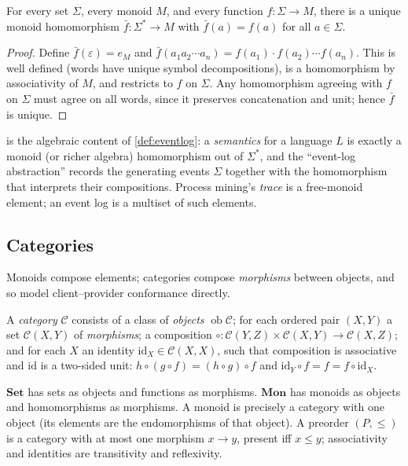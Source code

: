 \begin{theorem}
\label{thm:freemon}
For every set $\Sigma$, every monoid $M$, and every function $f\colon\Sigma\to M$,
there is a unique monoid homomorphism $\bar f\colon\Sigma^{*}\to M$ with $\bar
f(a)=f(a)$ for all $a\in\Sigma$.
\end{theorem}
\begin{proof}
Define $\bar f(\varepsilon)=e_M$ and $\bar f(a_1a_2\cdots a_n)=f(a_1)\cdot
f(a_2)\cdots f(a_n)$. This is well defined (words have unique symbol
decompositions), is a homomorphism by associativity of $M$, and restricts to $f$
on $\Sigma$. Any homomorphism agreeing with $f$ on $\Sigma$ must agree on all
words, since it preserves concatenation and unit; hence $\bar f$ is unique.
\end{proof}

 is the algebraic content of \cref{def:eventlog}: a
\emph{semantics} for a language $L$ is exactly a monoid (or richer algebra)
homomorphism out of $\Sigma^{*}$, and the ``event-log abstraction'' records the
generating events $\Sigma$ together with the homomorphism that interprets their
compositions. Process mining's \emph{trace} is a free-monoid element; an event
log is a multiset of such elements.

\subsection{Categories}
\label{sec:alg-cat}

Monoids compose elements; categories compose \emph{morphisms} between objects,
and so model client--provider conformance directly.

\begin{definition}[Category]
\label{def:category}
A \emph{category} $\mathcal C$ consists of a class of \emph{objects}
$\operatorname{ob}\mathcal C$; for each ordered pair $(X,Y)$ a set
$\mathcal C(X,Y)$ of \emph{morphisms}; a composition
$\circ\colon\mathcal C(Y,Z)\times\mathcal C(X,Y)\to\mathcal C(X,Z)$; and for each
$X$ an identity $\mathrm{id}_X\in\mathcal C(X,X)$, such that composition is
associative and $\mathrm{id}$ is a two-sided unit:
$h\circ(g\circ f)=(h\circ g)\circ f$ and $\mathrm{id}_Y\circ f=f=f\circ
\mathrm{id}_X$.
\end{definition}

\begin{example}
$\mathbf{Set}$ has sets as objects and functions as morphisms. $\mathbf{Mon}$ has
monoids as objects and homomorphisms as morphisms. A monoid is precisely a
category with one object (its elements are the endomorphisms of that object). A
preorder $(P,\le)$ is a category with at most one morphism $x\to y$, present iff
$x\le y$; associativity and identities are transitivity and reflexivity.
\end{example}

